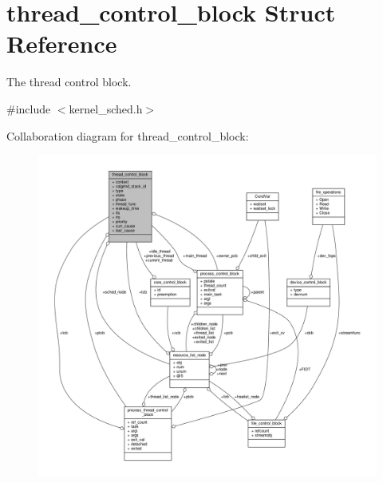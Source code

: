\hypertarget{structthread__control__block}{}\section{thread\+\_\+control\+\_\+block Struct Reference}
\label{structthread__control__block}


The thread control block.  




{\ttfamily \#include $<$kernel\+\_\+sched.\+h$>$}



Collaboration diagram for thread\+\_\+control\+\_\+block\+:\nopagebreak
\begin{figure}[H]
\begin{center}
\leavevmode
\includegraphics[width=350pt]{structthread__control__block__coll__graph}
\end{center}
\end{figure}
